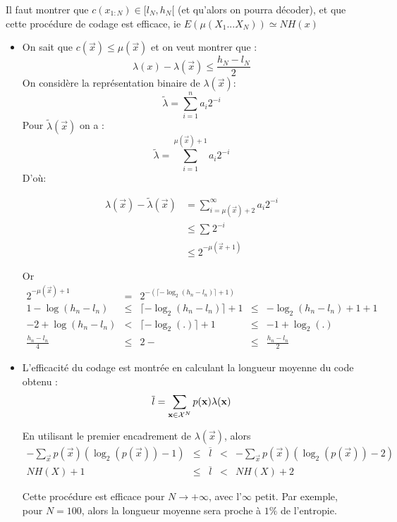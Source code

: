 \documentclass[main.tex]{subfiles}
\begin{document}
Il faut montrer que $c(x_{1:N}) \in [l_N,h_N[$ (et qu'alors on pourra décoder), et que cette procédure de codage est efficace, ie $E(\mu(X_1...X_N ))\simeq NH(x)$
\begin{itemize}
\item On sait que $c(\vec{x}) \leq \mu(\vec{x})$ et on veut montrer que :
\[
\lambda(x)-\lambda(\vec{x}) \leq \frac{h_N-l_N}{2}
\]
On considère la représentation binaire de $\lambda(\vec{x})$:
\[
  \tilde{\lambda} = \sum_{i=1}^{n}a_i2^{-i}
\]
Pour $\tilde{\lambda}(\vec{x})$ on a :
\[
  \tilde{\lambda} = \sum_{i=1}^{\mu(\vec{x})+1}a_i2^{-i}
\]
D'où:

  \begin{align*}
  \lambda(\vec{x})-\tilde{\lambda}(\vec{x}) &= \sum_{i=\mu(\vec{x})+2}^{\infty}a_i2^{-i} \\
                               &\leq \sum_{}^{} 2^{-i}\\
                               &\leq 2^{-\mu(\vec{x}+1)}
  \end{align*}

  Or
  \[
  \begin{array}{ccccc}

2^{-\mu(\vec{x})+1} &=& 2^{-\left(\lceil -\log_2(h_n-l_n)\rceil+1\right)}&&\\
1 -\log(h_n-l_n) &\le& \lceil -\log_2 (h_n-l_n)\rceil+1 &\leq& -\log_2(h_n-l_n)+1+1\\
-2 + \log(h_n-l_n ) & <& \lceil - \log_2( .)\rceil +1 &\le& -1 + \log_2(.)\\
\frac{h_n-l_n}{4}&\le& 2- &\le& \frac{h_n-l_n}{2}
  \end{array}
\]

\item L'efficacité du codage est montrée en calculant la longueur moyenne du code obtenu :
\[ \overline{l} = \sum_{\mathbf{x}\in\mathcal{X}^N} p(\mathbf{x}) \lambda(\mathbf{x}) \]

En utilisant le premier encadrement de $\lambda(\vec{x})$, alors
\[ \begin{array}{ccccc}
- \sum_{\vec{x}} p(\vec{x})( \log_2(p(\vec{x}))-1) & \leq & \overline{l} & < & -\sum_{\vec{x}} p(\vec{x})(\log_2(p(\vec{x}))-2) \\
NH(X) + 1 & \leq & \overline{l} & < & NH(X) + 2
\end{array}
\]

Cette procédure est efficace pour $N\to +\infty$, avec l'$\infty$ petit. Par exemple, pour $N=100$, alors la longueur moyenne sera proche à $1\%$ de l'entropie.
\end{itemize}
\end{document}
